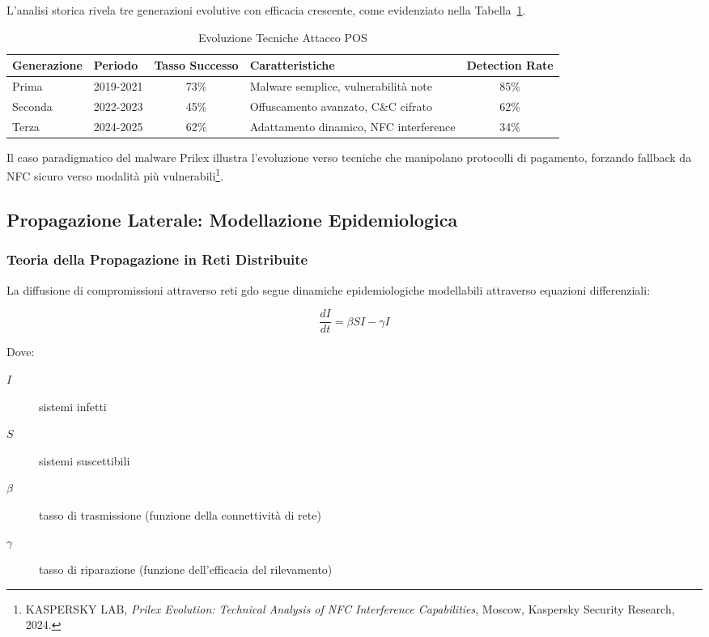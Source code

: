 L'analisi storica rivela tre generazioni evolutive con efficacia crescente, come evidenziato nella Tabella~\ref{tab:evoluzione-attacchi-pos}.

\begin{table}[htbp]
\centering
\caption{Evoluzione Tecniche Attacco POS}
\label{tab:evoluzione-attacchi-pos}
\begin{tabular}{|l|l|c|l|c|}
\hline
\textbf{Generazione} & \textbf{Periodo} & \textbf{Tasso Successo} & \textbf{Caratteristiche} & \textbf{Detection Rate} \\
\hline
Prima & 2019-2021 & 73\% & Malware semplice, vulnerabilità note & 85\% \\
\hline
Seconda & 2022-2023 & 45\% & Offuscamento avanzato, C\&C cifrato & 62\% \\
\hline
Terza & 2024-2025 & 62\% & Adattamento dinamico, NFC interference & 34\% \\
\hline
\end{tabular}
\end{table}

Il caso paradigmatico del malware Prilex illustra l'evoluzione verso tecniche che manipolano protocolli di pagamento, forzando fallback da NFC sicuro verso modalità più vulnerabili\footnote{KASPERSKY LAB, \textit{Prilex Evolution: Technical Analysis of NFC Interference Capabilities}, Moscow, Kaspersky Security Research, 2024.}.

\subsection{Propagazione Laterale: Modellazione Epidemiologica}
\label{subsec:propagazione-laterale}

\subsubsection{Teoria della Propagazione in Reti Distribuite}

La diffusione di compromissioni attraverso reti \gls{gdo} segue dinamiche epidemiologiche modellabili attraverso equazioni differenziali:

\begin{equation}
\frac{dI}{dt} = \beta SI - \gamma I
\label{eq:modello-epidemiologico}
\end{equation}

Dove:
\begin{description}
    \item[$I$] sistemi infetti
    \item[$S$] sistemi suscettibili
    \item[$\beta$] tasso di trasmissione (funzione della connettività di rete)
    \item[$\gamma$] tasso di riparazione (funzione dell'efficacia del rilevamento)
\end{description}

